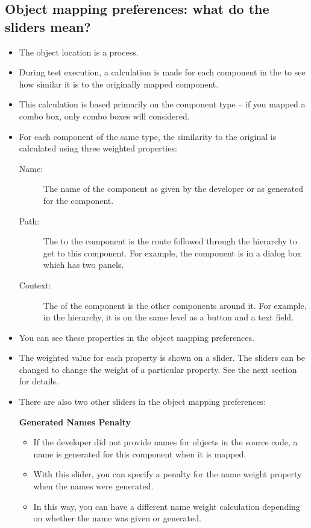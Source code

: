 \subsection{Object mapping preferences: what do the sliders mean?}
\label{obprefs}
\begin{itemize}
\item The object location is a  process.
\item During test execution, a calculation is made for each component in the \gdaut{} to see how similar it is to the originally mapped component.
\item This calculation is based primarily on the component type -- if you mapped a combo box, only combo boxes will considered.
\item For each component of the same type, the similarity to the original is calculated using three weighted properties:
\begin{description}
\item[Name:]{The name of the component as given by the developer or as generated for the component. }
\item[Path:]{The  to the component is the route followed through the \gdaut{} hierarchy to get to this component. For example, the component is in a dialog box which has two panels.}
\item[Context:]{The  of the component is the other components around it. For example, in the \gdaut{} hierarchy, it is on the same level as a button and a text field.}
 \end{description}
 \item You can see these properties in the object mapping preferences. 
 \item The weighted value for each property is shown on a slider. The sliders can be changed to change the weight of a particular property. See the next section  for details.
 \item There are also two other sliders in the object mapping preferences:
 

\textbf{Generated Names Penalty}
\begin{itemize}
\item If the developer did not provide names for objects in the source code, a name is generated for this component when it is mapped.
\item  With this slider, you can specify a penalty for the name weight property when the names were generated. 
\item In this way, you can have a different name weight calculation depending on whether the name was given or generated.
\end{itemize}


\end{itemize}
